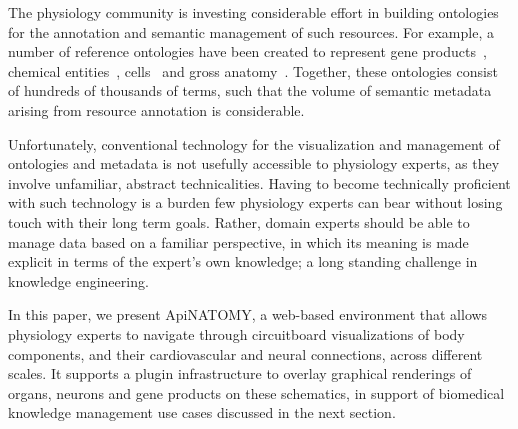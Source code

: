 The physiology community is investing
considerable effort in building ontologies for the annotation and semantic management of such
resources. For example, a number of reference ontologies have been created to represent gene
products~\cite{Bla+13}, chemical entities~\cite{HMD+13}, cells~\cite{BRA05} and gross
anatomy~\cite{RM03}. Together, these ontologies consist of hundreds of thousands of terms, such that
the volume of semantic metadata arising from resource annotation is considerable.

Unfortunately,
conventional technology for the visualization and management of ontologies and metadata is not
usefully accessible to
physiology experts, as they involve unfamiliar, abstract technicalities.
Having to become technically proficient with such technology is a burden few physiology experts can
bear without losing touch with their long term goals.
Rather, domain experts should be able to manage data based on a familiar perspective, in which its
meaning is made explicit in terms of the expert's own knowledge; a long standing challenge in
knowledge engineering.

%

%

In this paper, we present ApiNATOMY, a web-based environment that allows physiology experts to
navigate through circuitboard visualizations of body components, and their cardiovascular and neural
connections, across different scales. It supports a plugin infrastructure to overlay
graphical renderings of organs, neurons and gene products on these schematics, in support of
biomedical knowledge management use cases discussed in the next section.

